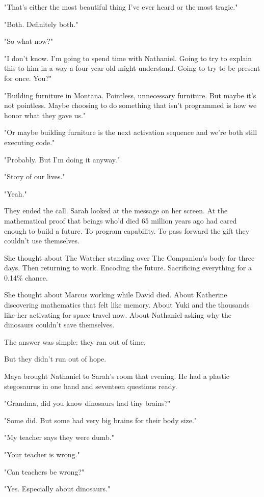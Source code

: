 "That's either the most beautiful thing I've ever heard or the most tragic."

"Both. Definitely both."

"So what now?"

"I don't know. I'm going to spend time with Nathaniel. Going to try to explain this to him in a way a four-year-old might understand. Going to try to be present for once. You?"

"Building furniture in Montana. Pointless, unnecessary furniture. But maybe it's not pointless. Maybe choosing to do something that isn't programmed is how we honor what they gave us."

"Or maybe building furniture is the next activation sequence and we're both still executing code."

"Probably. But I'm doing it anyway."

"Story of our lives."

"Yeah."

They ended the call. Sarah looked at the message on her screen. At the mathematical proof that beings who'd died 65 million years ago had cared enough to build a future. To program capability. To pass forward the gift they couldn't use themselves.

She thought about The Watcher standing over The Companion's body for three days. Then returning to work. Encoding the future. Sacrificing everything for a 0.14\% chance.

She thought about Marcus working while David died. About Katherine discovering mathematics that felt like memory. About Yuki and the thousands like her activating for space travel now. About Nathaniel asking why the dinosaurs couldn't save themselves.

The answer was simple: they ran out of time.

But they didn't run out of hope.

\scenebreak

Maya brought Nathaniel to Sarah's room that evening. He had a plastic stegosaurus in one hand and seventeen questions ready.

"Grandma, did you know dinosaurs had tiny brains?"

"Some did. But some had very big brains for their body size."

"My teacher says they were dumb."

"Your teacher is wrong."

"Can teachers be wrong?"

"Yes. Especially about dinosaurs."

